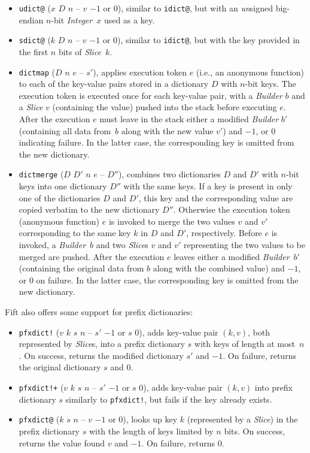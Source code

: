 \documentclass[12pt,oneside]{article}
\begin{document}
\begin{itemize}
\item {\tt udict@} ($x$ $D$ $n$ -- $v$ $-1$ or $0$), similar to {\tt idict@}, but with an {\em un}signed big-endian $n$-bit {\em Integer\/}~$x$ used as a key.
\item {\tt sdict@} ($k$ $D$ $n$ -- $v$ $-1$ or $0$), similar to {\tt idict@}, but with the key provided in the first $n$ bits of {\em Slice\/}~$k$.
\item {\tt dictmap} ($D$ $n$ $e$ -- $s'$), applies execution token $e$ (i.e., an anonymous function) to each of the key-value pairs stored in a dictionary $D$ with $n$-bit keys. The execution token is executed once for each key-value pair, with a {\em Builder\/} $b$ and a {\em Slice\/} $v$ (containing the value) pushed into the stack before executing $e$. After the execution $e$ must leave in the stack either a modified {\em Builder\/} $b'$ (containing all data from~$b$ along with the new value $v'$) and $-1$, or $0$ indicating failure. In the latter case, the corresponding key is omitted from the new dictionary.
\item {\tt dictmerge} ($D$ $D'$ $n$ $e$ -- $D''$), combines two dictionaries $D$ and $D'$ with $n$-bit keys into one dictionary $D''$ with the same keys. If a key is present in only one of the dictionaries $D$ and $D'$, this key and the corresponding value are copied verbatim to the new dictionary $D''$. Otherwise the execution token (anonymous function) $e$ is invoked to merge the two values $v$ and $v'$ corresponding to the same key $k$ in $D$ and $D'$, respectively. Before $e$ is invoked, a {\em Builder\/}~$b$ and two {\em Slice}s $v$ and $v'$ representing the two values to be merged are pushed. After the execution $e$ leaves either a modified {\em Builder\/}~$b'$ (containing the original data from $b$ along with the combined value) and $-1$, or $0$ on failure. In the latter case, the corresponding key is omitted from the new dictionary.
\end{itemize}
Fift also offers some support for prefix dictionaries:
\begin{itemize}
\item {\tt pfxdict!} ($v$ $k$ $s$ $n$ -- $s'$ $-1$ or $s$ $0$), adds key-value pair $(k,v)$, both represented by {\em Slice\/}s, into a prefix dictionary $s$ with keys of length at most~$n$. On success, returns the modified dictionary $s'$ and $-1$. On failure, returns the original dictionary $s$ and $0$.
\item {\tt pfxdict!+} ($v$ $k$ $s$ $n$ -- $s'$ $-1$ or $s$ $0$), adds key-value pair $(k,v)$ into prefix dictionary $s$ similarly to {\tt pfxdict!}, but fails if the key already exists.
\item {\tt pfxdict@} ($k$ $s$ $n$ -- $v$ $-1$ or $0$), looks up key $k$ (represented by a {\em Slice\/}) in the prefix dictionary $s$ with the length of keys limited by $n$ bits. On success, returns the value found $v$ and $-1$. On failure, returns $0$.
\end{itemize}
\end{document}
